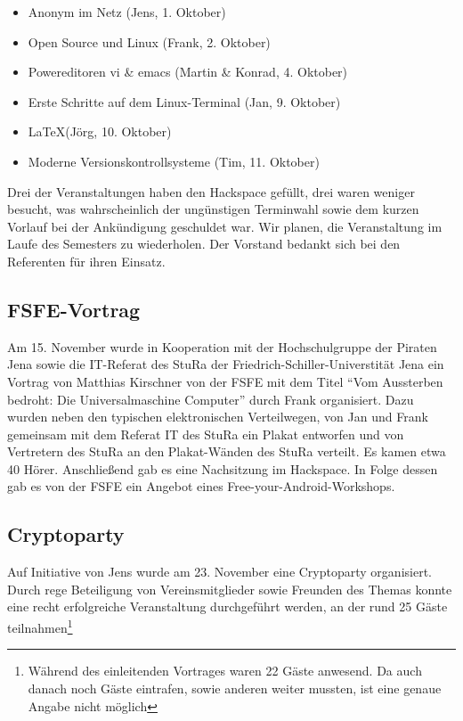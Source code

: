 \documentclass[10pt,DIV16]{scrartcl}
\begin{document}
\begin{itemize}
	\item Anonym im Netz (Jens, 1. Oktober)
	\item Open Source und Linux (Frank, 2. Oktober)
	\item Powereditoren vi \& emacs (Martin \& Konrad, 4. Oktober)
	\item Erste Schritte auf dem Linux-Terminal (Jan, 9. Oktober)
	\item \LaTeX (Jörg, 10. Oktober)
	\item Moderne Versionskontrollsysteme (Tim, 11. Oktober)
\end{itemize}

Drei der Veranstaltungen haben den Hackspace gefüllt, drei waren weniger
besucht, was wahrscheinlich der ungünstigen Terminwahl sowie dem kurzen
Vorlauf bei der Ankündigung geschuldet war.  Wir planen, die Veranstaltung im
Laufe des Semesters zu wiederholen.  Der Vorstand bedankt sich bei den
Referenten für ihren Einsatz.

\subsection{FSFE-Vortrag}

Am 15. November wurde in Kooperation mit der Hochschulgruppe der 
Piraten Jena sowie die IT-Referat des StuRa der 
Friedrich-Schiller-Universtität Jena ein Vortrag von Matthias 
Kirschner von der FSFE mit dem Titel "`Vom Aussterben bedroht: Die 
Universalmaschine Computer"' durch Frank organisiert.  Dazu wurden 
neben den typischen elektronischen Verteilwegen, von Jan und Frank 
gemeinsam mit dem Referat IT des StuRa ein Plakat entworfen und von 
Vertretern des StuRa an den Plakat-Wänden des StuRa verteilt. Es 
kamen etwa 40 Hörer. Anschließend gab es eine Nachsitzung im 
Hackspace. In Folge dessen gab es von der FSFE ein Angebot eines 
\frqq{}Free-your-Android\flqq{}-Workshops.

\subsection{Cryptoparty}

Auf Initiative von Jens wurde am 23. November eine Cryptoparty 
organisiert. Durch rege Beteiligung von Vereinsmitglieder sowie 
Freunden des Themas konnte eine recht erfolgreiche Veranstaltung 
durchgeführt werden, an der rund 25 Gäste teilnahmen\footnote 
{Während des einleitenden Vortrages waren 22 Gäste anwesend. Da auch danach noch Gäste eintrafen, sowie anderen weiter mussten, ist eine genaue Angabe nicht möglich} 
\end{document}
